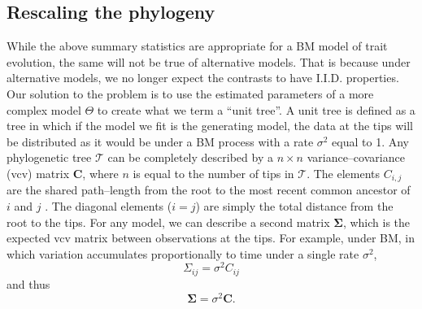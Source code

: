 \documentclass[12pt]{article}
\begin{document}
\subsection*{Rescaling the phylogeny}

While the above summary statistics are appropriate for a BM model of trait evolution, the same will not be true of alternative models. That is because under alternative models, we no longer expect the contrasts to have I.I.D. properties. Our solution to the problem is to use the estimated parameters of a more complex model $\Theta$ to create what we term a ``unit tree''. A unit tree is defined as a tree in which if the model we fit is the generating model, the data at the tips will be distributed as it would be under a BM process with a rate $\sigma^2$ equal to 1. Any phylogenetic tree $\mathcal{T}$ can be completely described by a $n \times n$ variance--covariance (vcv) matrix $\mathbf{C}$, where $n$ is equal to the number of tips in $\mathcal{T}$. The elements $C_{i,j}$ are the shared path--length from the root to the most recent common ancestor of $i$ and $j$ \citep{Piazza1975}. The diagonal elements ($i = j$) are simply the total distance from the root to the tips. For any model, we can describe a second matrix $\mathbf{\Sigma}$, which is the expected vcv matrix between observations at the tips. For example, under BM, in which variation accumulates proportionally to time under a single rate $\sigma^2$,
\begin{equation}
\Sigma_{ij} = \sigma^2 C_{ij}
\end{equation}
and thus
\begin{equation}
\mathbf{\Sigma} = \sigma^2 \mathbf{C}.
\end{equation}
\end{document}
